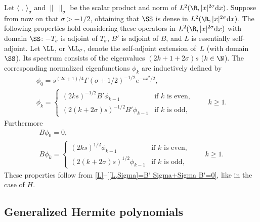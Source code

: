 Let $\langle\ ,\ \rangle_\sigma$ and $\|\ \|_\sigma$ be the scalar product and norm of $L^2(\R,|x|^{2\sigma}{\rm d}x)$. Suppose from now on that $\sigma>-1/2$, obtaining that $\SS$ is dense in $L^2(\R,|x|^{2\sigma}{\rm d}x)$. The following properties hold considering these operators in $L^2(\R,|x|^{2\sigma}{\rm d}x)$ with domain $\SS$: $-T_\sigma$ is adjoint of $T_\sigma$, $B'$ is adjoint of $B$, and $L$ is essentially self-adjoint. Let $\LL$, or $\LL_\sigma$, denote the self-adjoint extension of~$L$ (with domain~$\SS$). Its spectrum consists of the eigenvalues $(2k+1+2\sigma)s$ ($k\in\N$). The corresponding normalized eigenfunctions $\phi_k$ are inductively def\/ined by
  \begin{gather}
    \phi_0 =s^{(2\sigma+1)/4}\Gamma(\sigma+1/2)^{-1/2}e^{-sx^2/2} ,\label{phi 0}\\
    \phi_k =
      \begin{cases}
        (2ks)^{-1/2}B'\phi_{k-1} & \text{if $k$ is even},\\
        (2(k+2\sigma)s)^{-1/2}B'\phi_{k-1} & \text{if $k$ is odd},
      \end{cases}
    \qquad k\ge1 .
    \label{phi k}
  \end{gather}
Furthermore
    \begin{gather}
      B\phi_0 =0 ,\label{B phi 0}\\
      B\phi_k =
        \begin{cases}
          (2ks)^{1/2}\phi_{k-1} & \text{if $k$ is even},\\
          (2(k+2\sigma)s)^{1/2}\phi_{k-1} & \text{if $k$ is odd},
        \end{cases}
      \qquad k\ge1 .
      \label{B phi k}
    \end{gather}
These properties follow from \eqref{L}--\eqref{[L,Sigma]=B' Sigma+Sigma B'=0}, like in the case of $H$.



\subsection{Generalized Hermite polynomials}\label{ss:p k}

